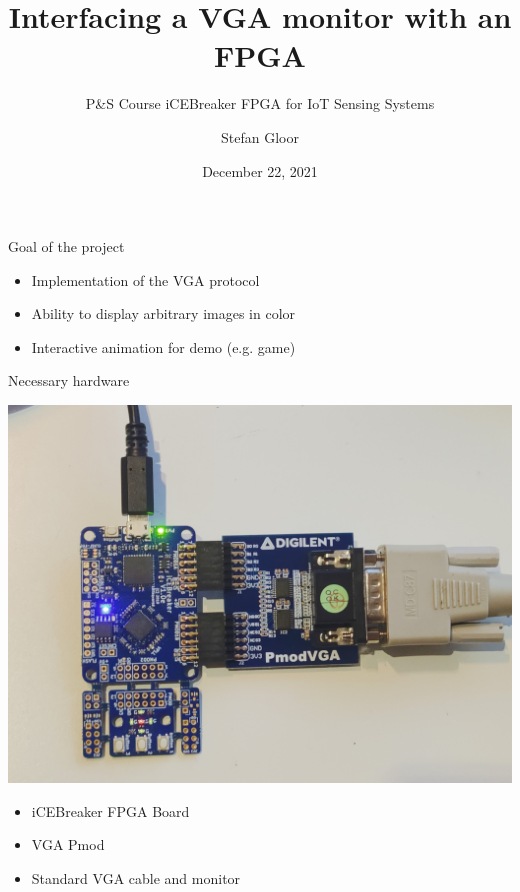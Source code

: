\documentclass{beamer}
\title{Interfacing a VGA monitor with an FPGA}
\subtitle{P\&S Course iCEBreaker FPGA for IoT Sensing Systems}
\institute{ETH Zürich}
\author{Stefan Gloor}
\date{December 22, 2021}
\begin{document}
\begin{frame}
	\titlepage
\end{frame}

\begin{frame}{Goal of the project}
	\begin{itemize}
		\item Implementation of the VGA protocol
		\item Ability to display arbitrary images in color
		\item Interactive animation for demo (e.g. game)
	\end{itemize}
\end{frame}

\begin{frame}{Necessary hardware}
	\begin{minipage}{0.49\textwidth}
		\includegraphics[width=\textwidth]{../hardware.jpg}
	\end{minipage}
	\begin{minipage}{0.49\textwidth}
		\begin{itemize}
			\item iCEBreaker FPGA Board
			\item VGA Pmod
			\item Standard VGA cable and monitor
		\end{itemize}
	\end{minipage}
\end{frame}
\end{document}
